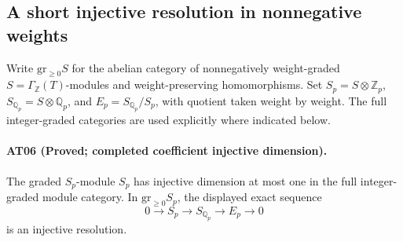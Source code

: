 \subsection{A short injective resolution in nonnegative weights}

Write $\mathrm{gr}_{\geq0}S$ for the abelian category of
nonnegatively weight-graded $S=\Gamma_{\mathbb Z}(T)$-modules
and weight-preserving homomorphisms. Set
$S_p=S\otimes\mathbb Z_p$, $S_{\mathbb Q_p}=S\otimes\mathbb Q_p$,
and $E_p=S_{\mathbb Q_p}/S_p$, with quotient taken weight by
weight. The full integer-graded categories are used explicitly
where indicated below.

\paragraph{AT06 (Proved; completed coefficient injective dimension).}
The graded $S_p$-module $S_p$ has injective dimension at most
one in the full integer-graded module category. In
$\mathrm{gr}_{\geq0}S_p$, the displayed exact sequence
\[
 0\longrightarrow S_p\longrightarrow S_{\mathbb Q_p}
 \longrightarrow E_p\longrightarrow0
 \tag{AT.6}
\]
is an injective resolution.

